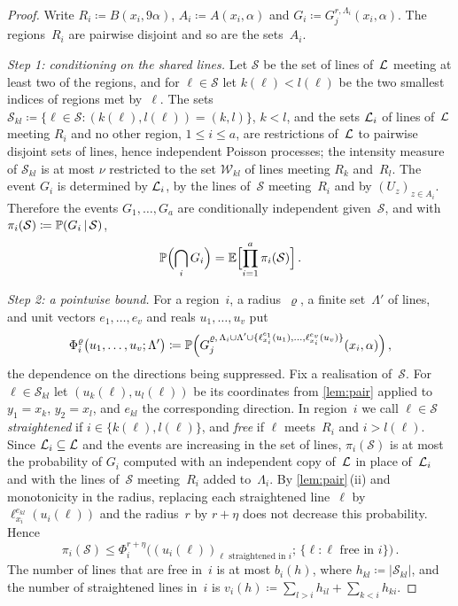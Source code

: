 \documentclass[11pt,letterpaper]{article}
\newcommand{\cS}{\mathcal S}
\newcommand{\cW}{\mathcal W}
\begin{document}
\begin{proof}
Write $R_i\coloneqq B(x_i,9\alpha)$, $A_i\coloneqq A(x_i,\alpha)$ and $G_i\coloneqq G_j^{r,\Lambda_i}(x_i,\alpha)$. The regions~$R_i$ are pairwise disjoint and so are the sets~$A_i$.

\emph{Step 1: conditioning on the shared lines.} Let $\cS$ be the set of lines of~$\cL$ meeting at least two of the regions, and for $\ell\in\cS$ let $k(\ell)<l(\ell)$ be the two smallest indices of regions met by~$\ell$. The sets $\cS_{kl}\coloneqq\{\ell\in\cS\colon(k(\ell),l(\ell))=(k,l)\}$, $k<l$, and the sets $\cL_i$ of lines of~$\cL$ meeting $R_i$ and no other region, $1\le i\le a$, are restrictions of~$\cL$ to pairwise disjoint sets of lines, hence independent Poisson processes; the intensity measure of $\cS_{kl}$ is at most $\nu$ restricted to the set $\cW_{kl}$ of lines meeting $R_k$ and~$R_l$. The event $G_i$ is determined by $\cL_i$, by the lines of~$\cS$ meeting~$R_i$ and by $(U_z)_{z\in A_i}$. Therefore the events $G_1,\dots,G_a$ are conditionally independent given~$\cS$, and with $\pi_i(\cS)\coloneqq\P(G_i\,\vert\,\cS)$,
\begin{equation}
\label{eq:cond}
  \P\Bigl(\bigcap_iG_i\Bigr)=\E\Bigl[\prod_{i=1}^a\pi_i(\cS)\Bigr]\,.
\end{equation}

\emph{Step 2: a pointwise bound.} For a region~$i$, a radius~$\varrho$, a finite set~$\Lambda'$ of lines, and unit vectors $e_1,\dots,e_v$ and reals $u_1,\dots,u_v$ put
\begin{equation*}
  \Phi_i^\varrho\bigl(u_1,\dots,u_v;\Lambda'\bigr)\coloneqq\P\Bigl(G_j^{\varrho,\,\Lambda_i\cup\Lambda'\cup\{\ell^{e_1}_{x_i}(u_1),\dots,\ell^{e_v}_{x_i}(u_v)\}}(x_i,\alpha)\Bigr)\,,
\end{equation*}
the dependence on the directions being suppressed. Fix a realisation of~$\cS$. For $\ell\in\cS_{kl}$ let $(u_k(\ell),u_l(\ell))$ be its coordinates from \cref{lem:pair} applied to $y_1=x_k$, $y_2=x_l$, and $e_{kl}$ the corresponding direction. In region~$i$ we call $\ell\in\cS$ \emph{straightened} if $i\in\{k(\ell),l(\ell)\}$, and \emph{free} if $\ell$ meets~$R_i$ and $i>l(\ell)$. Since $\cL_i\subseteq\cL$ and the events are increasing in the set of lines, $\pi_i(\cS)$ is at most the probability of $G_i$ computed with an independent copy of~$\cL$ in place of~$\cL_i$ and with the lines of~$\cS$ meeting~$R_i$ added to~$\Lambda_i$. By \cref{lem:pair}\,(ii) and monotonicity in the radius, replacing each straightened line~$\ell$ by $\ell^{e_{kl}}_{x_i}(u_i(\ell))$ and the radius~$r$ by $r+\eta$ does not decrease this probability. Hence
\begin{equation}
\label{eq:pointwise}
  \pi_i(\cS)\le\Phi_i^{r+\eta}\bigl((u_i(\ell))_{\ell\text{ straightened in }i};\,\{\ell\colon\ell\text{ free in }i\}\bigr)\,.
\end{equation}
The number of lines that are free in~$i$ is at most $b_i(h)$, where $h_{kl}\coloneqq\lvert\cS_{kl}\rvert$, and the number of straightened lines in~$i$ is $v_i(h)\coloneqq\sum_{l>i}h_{il}+\sum_{k<i}h_{ki}$.


\end{proof}
\end{document}
